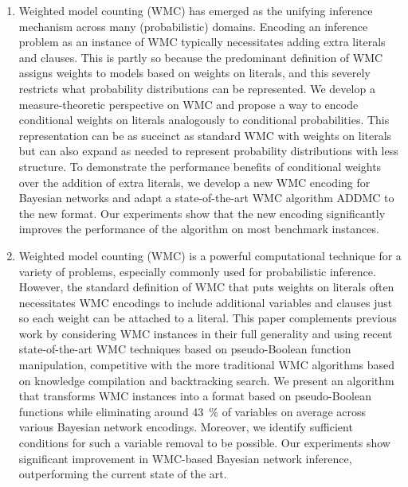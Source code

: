 \begin{enumerate}
\item Weighted model counting (WMC) has emerged as the unifying inference mechanism across many (probabilistic) domains. Encoding an inference problem as an instance of WMC typically necessitates adding extra literals and clauses. This is partly so because the predominant definition of WMC assigns weights to models based on weights on literals, and this severely restricts what probability distributions can be represented. We develop a measure-theoretic perspective on WMC and propose a way to encode conditional weights on literals analogously to conditional probabilities. This representation can be as succinct as standard WMC with weights on literals but can also expand as needed to represent probability distributions with less structure. To demonstrate the performance benefits of conditional weights over the addition of extra literals, we develop a new WMC encoding for Bayesian networks and adapt a state-of-the-art WMC algorithm \textsf{ADDMC} to the new format. Our experiments show that the new encoding significantly improves the performance of the algorithm on most benchmark instances.
\item Weighted model counting (WMC) is a powerful computational technique for a variety of problems, especially commonly used for probabilistic inference. However, the standard definition of WMC that puts weights on literals often necessitates WMC encodings to include additional variables and clauses just so each weight can be attached to a literal. This paper complements previous work by considering WMC instances in their full generality and using recent state-of-the-art WMC techniques based on pseudo-Boolean function manipulation, competitive with the more traditional WMC algorithms based on knowledge compilation and backtracking search. We present an algorithm that transforms WMC instances into a format based on pseudo-Boolean functions while eliminating around \SI{43}{\percent} of variables on average across various Bayesian network encodings. Moreover, we identify sufficient conditions for such a variable removal to be possible. Our experiments show significant improvement in WMC-based Bayesian network inference, outperforming the current state of the art.

\end{enumerate}
